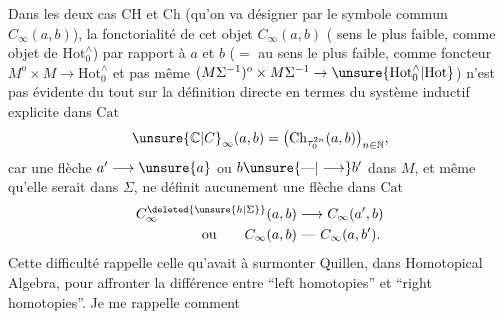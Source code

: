 Dans les deux cas $\mathrm{CH}$ et $\mathrm{Ch}$ (qu'on va désigner par le symbole commun $C_{\infty}(a,b)$), la fonctorialité de cet objet $C_{\infty}(a,b)$ (  sens le plus faible, comme objet de $\mathrm{Hot}_0^{\wedge}$) par rapport à $a$ et $b$ ($=$ au sens le plus faible, comme foncteur $M^o\times M\longrightarrow\mathrm{Hot}_0^{\wedge}$ et pas même $(M\Sigma^{-1})^o\times M\Sigma^{-1}\to\unsure{\mathrm{Hot}_0^{\wedge}|\mathrm{Hot}}$) n'est pas évidente du tout sur la définition directe  en termes du système inductif explicite dans $\mathrm{Cat}$
\[
\unsure{\mathbb C|C}_{\infty}(a,b)=\bigl(\mathrm{Ch}_{\tau_0^{2n}}(a,b)\bigr)_{n\in\mathbb N},
\]
car une flèche $a'\longrightarrow\unsure{a}$ ou $b\unsure{\text{---}|\longrightarrow}b'$ dans $M$, et même qu'elle serait dans $\Sigma$, ne définit aucunement une  flèche dans $\mathrm{Cat}$
\[
\begin{aligned}
C^{\deleted{\unsure{h|\Sigma}}}_{\infty}(a,b)&\longrightarrow C_{\infty}(a',b)\\
\text{ou}\qquad C_{\infty}(a,b)&\ \text{---}\ C_{\infty}(a,b').
\end{aligned}
\]
Cette difficulté rappelle celle qu'avait à surmonter Quillen, dans Homotopical Algebra, pour affronter la différence entre ``left homotopies'' et ``right homotopies''. Je me rappelle comment

